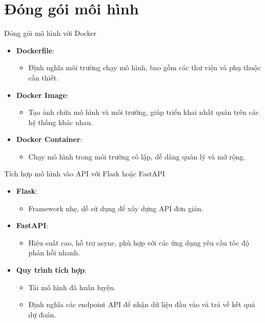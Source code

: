 \documentclass{beamer}
\begin{document}
\section{Đóng gói môi hình}

\begin{frame}{Đóng gói mô hình với Docker}
    \begin{itemize}
        \item \textbf{Dockerfile}:
        \begin{itemize}
            \item Định nghĩa môi trường chạy mô hình, bao gồm các thư viện và phụ thuộc cần thiết.
        \end{itemize}
        \item \textbf{Docker Image}:
        \begin{itemize}
            \item Tạo ảnh chứa mô hình và môi trường, giúp triển khai nhất quán trên các hệ thống khác nhau.
        \end{itemize}
        \item \textbf{Docker Container}:
        \begin{itemize}
            \item Chạy mô hình trong môi trường cô lập, dễ dàng quản lý và mở rộng.
        \end{itemize}
    \end{itemize}
\end{frame}
    
\begin{frame}{Tích hợp mô hình vào API với Flask hoặc FastAPI}
    \begin{itemize}
        \item \textbf{Flask}:
        \begin{itemize}
            \item Framework nhẹ, dễ sử dụng để xây dựng API đơn giản.
        \end{itemize}
        \item \textbf{FastAPI}:
        \begin{itemize}
            \item Hiệu suất cao, hỗ trợ async, phù hợp với các ứng dụng yêu cầu tốc độ phản hồi nhanh.
        \end{itemize}
        \item \textbf{Quy trình tích hợp}:
        \begin{itemize}
            \item Tải mô hình đã huấn luyện.
            \item Định nghĩa các endpoint API để nhận dữ liệu đầu vào và trả về kết quả dự đoán.
        \end{itemize}
    \end{itemize}
\end{frame}
\end{document}

